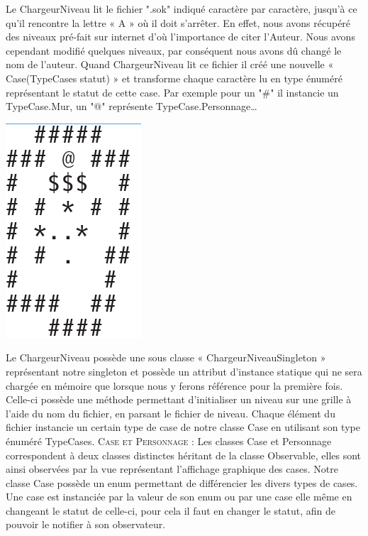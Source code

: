 \documentclass[a4paper,12pt]{article} %
\begin{document}
\newpage
Le ChargeurNiveau lit le fichier ".sok" indiqué caractère par caractère, jusqu’à ce qu’il rencontre la lettre « A » où il doit s’arrêter. En effet, nous avons récupéré des niveaux pré-fait sur internet d’où l’importance de citer l’Auteur. Nous avons cependant modifié quelques niveaux, par conséquent nous avons dû changé le nom de l’auteur. Quand ChargeurNiveau lit ce fichier il créé une nouvelle « Case(TypeCases statut) » et transforme chaque caractère lu en type énuméré représentant le statut de cette case. Par exemple pour un "\#" il instancie un TypeCase.Mur, un "@"  représente TypeCase.Personnage…
\newline
\begin{center} \includegraphics[scale=1]{code3.png} \end{center}
Le ChargeurNiveau possède une sous classe « ChargeurNiveauSingleton » représentant notre singleton et possède un attribut d’instance statique qui ne sera chargée en mémoire que lorsque nous y ferons référence pour la première fois.
Celle-ci possède une méthode permettant d'initialiser un niveau sur une grille à l'aide du nom du fichier, en parsant le fichier de niveau. Chaque élément du fichier instancie un certain type de case de notre classe Case en utilisant son type énuméré TypeCases.
\newpage
\noindent
\textsc{Case et Personnage :}
\newline\newline
Les classes Case et Personnage correspondent à deux classes distinctes héritant de la classe Observable, elles sont ainsi observées par la vue représentant l'affichage graphique des cases.
\newline
Notre classe Case possède un enum permettant de différencier les divers types de cases. Une case est instanciée par la valeur de son enum ou par une case elle même en changeant le statut de celle-ci, pour cela il faut en changer le statut, afin de pouvoir le notifier à son observateur.
\end{document}
